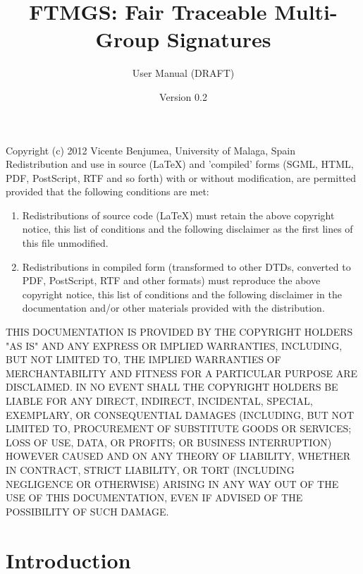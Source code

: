 \documentclass[a4paper]{article}
\title{FTMGS: Fair Traceable Multi-Group Signatures}
\author{User Manual (DRAFT)}
\date{Version 0.2}
\begin{document}
\maketitle
\enlargethispage{8mm}
\tableofcontents
\newpage
\vspace*{\fill}\noindent
\begin{minipage}{\linewidth}\footnotesize
\noindent
Copyright (c)  2012  Vicente Benjumea, University of Malaga, Spain\\

\noindent
Redistribution and use in source (LaTeX) and 'compiled' forms
(SGML, HTML, PDF, PostScript, RTF and so forth) with or without
modification, are permitted provided that the following conditions are
met:
\begin{enumerate}
\item Redistributions of source code (LaTeX) must retain the
      above copyright notice, this list of conditions and the
      following disclaimer as the first lines of this file unmodified.

\item Redistributions in compiled form (transformed to other DTDs,
      converted to PDF, PostScript, RTF and other formats) must
      reproduce the above copyright notice, this list of conditions
      and the following disclaimer in the documentation and/or other
      materials provided with the distribution.
\end{enumerate}
THIS DOCUMENTATION IS PROVIDED BY THE COPYRIGHT HOLDERS "AS IS" AND
ANY EXPRESS OR IMPLIED WARRANTIES, INCLUDING, BUT NOT LIMITED TO, THE
IMPLIED WARRANTIES OF MERCHANTABILITY AND FITNESS FOR A PARTICULAR
PURPOSE ARE DISCLAIMED. IN NO EVENT SHALL THE COPYRIGHT HOLDERS BE
LIABLE FOR ANY DIRECT, INDIRECT, INCIDENTAL, SPECIAL, EXEMPLARY, OR
CONSEQUENTIAL DAMAGES (INCLUDING, BUT NOT LIMITED TO, PROCUREMENT OF
SUBSTITUTE GOODS OR SERVICES; LOSS OF USE, DATA, OR PROFITS; OR
BUSINESS INTERRUPTION) HOWEVER CAUSED AND ON ANY THEORY OF LIABILITY,
WHETHER IN CONTRACT, STRICT LIABILITY, OR TORT (INCLUDING NEGLIGENCE
OR OTHERWISE) ARISING IN ANY WAY OUT OF THE USE OF THIS DOCUMENTATION,
EVEN IF ADVISED OF THE POSSIBILITY OF SUCH DAMAGE.
\end{minipage}
\newpage
\section{Introduction}
\end{document}
